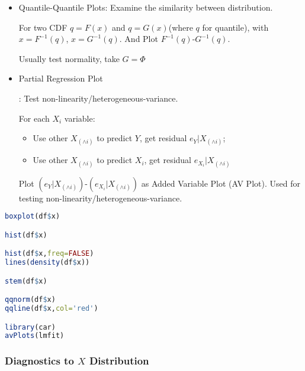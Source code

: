 \begin{itemize}[topsep=2pt,itemsep=2pt]
        \item Quantile-Quantile Plots\hypertarget{QQplot}{}: Examine the similarity  between distribution.
            
        For two CDF $ q=F(x) $ and $ q=G(x) $(where $ q $ for quantile), with $ x=F^{-1}(q) $, $ x=G^{-1}(q) $. And Plot $ F^{-1}(q) $-$ G^{-1}(q) $.

        Usually test normality, take $ G=\Phi  $



        \item \hypertarget{AVPlot}{Partial Regression Plot}: Test non-linearity/heterogeneous-variance.
    
        For each $ X_i $ variable: 
        \begin{itemize}[topsep=2pt,itemsep=0pt]
            \item Use other $ X_{(\wedge i)} $ to predict $ Y $, get residual $ e_Y|X_{(\wedge i)} $;
            \item Use other $ X_{(\wedge i)} $ to predict $ X_i $, get residual $ e_{X_i}|X_{(\wedge i)} $
        \end{itemize}
        
        Plot $ (e_Y|X_{(\wedge i)}) $-$ (e_{X_i}|X_{(\wedge i)}) $ as Added Variable Plot (AV Plot). Used for testing non-linearity/heterogeneous-variance.
    \end{itemize}

     
\begin{rcode}
\begin{lstlisting}[language=R]
boxplot(df$x)

hist(df$x)

hist(df$x,freq=FALSE)
lines(density(df$x))

stem(df$x)

qqnorm(df$x)
qqline(df$x,col='red')

library(car)
avPlots(lmfit)
\end{lstlisting}

\end{rcode}




    
\subsubsection{Diagnostics to $ X $ Distribution}\label{SubSecDiagnostics}





